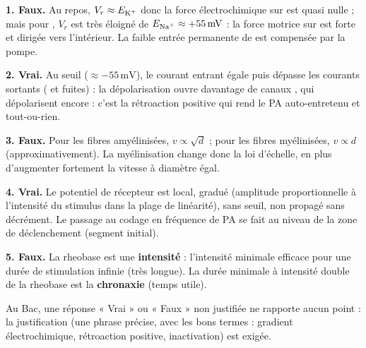 \documentclass[11pt]{article}
\begin{document}
\begin{corrige}
\textbf{1. Faux.} Au repos, $V_r \approx E_{\ce{K+}}$ donc la force électrochimique sur  est quasi nulle ; mais pour , $V_r$ est très éloigné de $E_{\ce{Na+}} \approx +55\,\text{mV}$ : la force motrice sur  est forte et dirigée vers l'intérieur. La faible entrée permanente de  est compensée par la pompe.

\textbf{2. Vrai.} Au seuil ($\approx -55\,\text{mV}$), le courant entrant  égale puis dépasse les courants sortants ( et fuites) : la dépolarisation ouvre davantage de canaux , qui dépolarisent encore : c'est la rétroaction positive qui rend le PA auto-entretenu et tout-ou-rien.

\textbf{3. Faux.} Pour les fibres amyélinisées, $v \propto \sqrt{d}$ ; pour les fibres myélinisées, $v \propto d$ (approximativement). La myélinisation change donc la loi d'échelle, en plus d'augmenter fortement la vitesse à diamètre égal.

\textbf{4. Vrai.} Le potentiel de récepteur est local, gradué (amplitude proportionnelle à l'intensité du stimulus dans la plage de linéarité), sans seuil, non propagé sans décrément. Le passage au codage en fréquence de PA se fait au niveau de la zone de déclenchement (segment initial).

\textbf{5. Faux.} La rheobase est une \textbf{intensité} : l'intensité minimale efficace pour une durée de stimulation infinie (très longue). La durée minimale à intensité double de la rheobase est la \textbf{chronaxie} (temps utile).

\begin{attention}
Au Bac, une réponse « Vrai » ou « Faux » non justifiée ne rapporte aucun point : la justification (une phrase précise, avec les bons termes : gradient électrochimique, rétroaction positive, inactivation) est exigée.
\end{attention}
\end{corrige}
\end{document}
